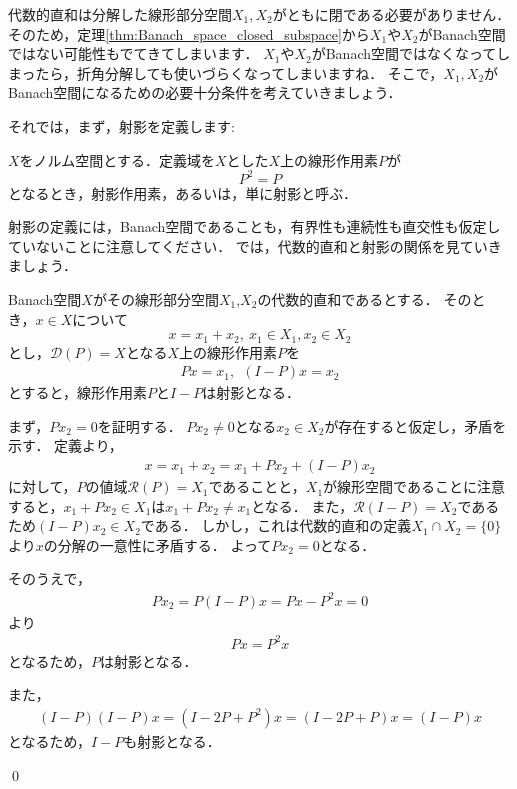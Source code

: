 代数的直和は分解した線形部分空間$X_1,  X_2$がともに閉である必要がありません．
そのため，定理\ref{thm:Banach_space_closed_subspace}から$X_1$や$X_2$がBanach空間ではない可能性もでてきてしまいます．
$X_1$や$X_2$がBanach空間ではなくなってしまったら，折角分解しても使いづらくなってしまいますね．
そこで，$X_1,  X_2$がBanach空間になるための必要十分条件を考えていきましょう．

それでは，まず，射影を定義します:
\begin{defi}[射影]
	$X$をノルム空間とする．定義域を$X$とした$X$上の線形作用素$P$が
	\[
		P^2 = P
	\]
	となるとき，射影作用素，あるいは，単に射影と呼ぶ．		
\end{defi}

射影の定義には，Banach空間であることも，有界性も連続性も直交性も仮定していないことに注意してください．
では，代数的直和と射影の関係を見ていきましょう．

\begin{Thm}\label{thm:projection}
	Banach空間$X$がその線形部分空間$X_1$,$X_2$の代数的直和であるとする．
	そのとき，$x \in X$について
	\[
	x = x_1 + x_2, ~ x_1 \in X_1, x_2 \in X_2
	\]
	とし，${\mathcal D}(P) = X$となる$X$上の線形作用素$P$を
	\begin{align*}
		P x = x_1,~ ~ (I - P)x = x_2
	\end{align*}
	とすると，線形作用素$P$と$I-P$は射影となる．
\end{Thm}

\begin{Proof}
	まず，$P x_2 = 0$を証明する．
	$P x_2 \neq 0$となる$x_2 \in X_2$が存在すると仮定し，矛盾を示す．
	定義より，
	\begin{align*}
		x = x_1 + x_2 = x_1 + P x_2 + (I - P) x_2
	\end{align*}
	に対して，$P$の値域${\mathcal R}(P) = X_1$であることと，$X_1$が線形空間であることに注意すると，$x_1 + P x_2 \in X_1$は$x_1 + P x_2 \neq x_1$となる．
	また，${\mathcal R}(I-P) = X_2$であるため$(I - P)x_2 \in X_2$である．
	しかし，これは代数的直和の定義$X_1 \cap X_2 = \{ 0 \}$より$x$の分解の一意性に矛盾する．
	よって$P x_2 = 0$となる．
	
	
	そのうえで，
	\begin{align*}
		P x_2 = P (I - P)x = Px - P^2 x = 0
	\end{align*}
	より
	\begin{align*}
		Px = P^2 x
	\end{align*}
	となるため，$P$は射影となる．
	
	また，
	\begin{align*}
		(I - P) ( I - P )x = (I - 2 P + P^2)x = (I - 2 P + P)x = (I - P)x
	\end{align*}
	となるため，$I - P$も射影となる．

\qed
\end{Proof}

